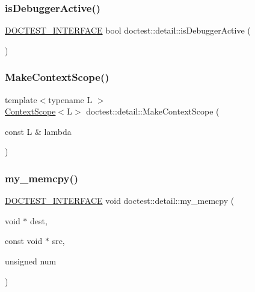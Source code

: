 \mbox{\label{namespacedoctest_1_1detail_a013828c4e677241cc26aeea33f762710}} 
\subsubsection{\texorpdfstring{is\+Debugger\+Active()}{isDebuggerActive()}}
{\footnotesize\ttfamily \hyperlink{doctest_8h_a9c16ffc635ec47f07797d21ede26b1a5}{D\+O\+C\+T\+E\+S\+T\+\_\+\+I\+N\+T\+E\+R\+F\+A\+CE} bool doctest\+::detail\+::is\+Debugger\+Active (\begin{DoxyParamCaption}{ }\end{DoxyParamCaption})}

\mbox{\label{namespacedoctest_1_1detail_a193493f40330f096b9e1b78557a832a3}} 
\subsubsection{\texorpdfstring{Make\+Context\+Scope()}{MakeContextScope()}}
{\footnotesize\ttfamily template$<$typename L $>$ \\
\hyperlink{classdoctest_1_1detail_1_1ContextScope}{Context\+Scope}$<$L$>$ doctest\+::detail\+::\+Make\+Context\+Scope (\begin{DoxyParamCaption}\item[{const L \&}]{lambda }\end{DoxyParamCaption})}

\mbox{\label{namespacedoctest_1_1detail_a4027cb5407ce2ff132645e89bba97010}} 
\subsubsection{\texorpdfstring{my\+\_\+memcpy()}{my\_memcpy()}}
{\footnotesize\ttfamily \hyperlink{doctest_8h_a9c16ffc635ec47f07797d21ede26b1a5}{D\+O\+C\+T\+E\+S\+T\+\_\+\+I\+N\+T\+E\+R\+F\+A\+CE} void doctest\+::detail\+::my\+\_\+memcpy (\begin{DoxyParamCaption}\item[{void $\ast$}]{dest,  }\item[{const void $\ast$}]{src,  }\item[{unsigned}]{num }\end{DoxyParamCaption})}

